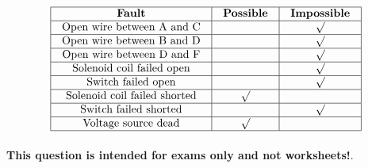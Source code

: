 

$$\vbox{\offinterlineskip
\halign{\strut
\vrule \quad\hfil # \ \hfil & 
\vrule \quad\hfil # \ \hfil & 
\vrule \quad\hfil # \ \hfil \vrule \cr
\noalign{\hrule}
%
{\bf Fault} & {\bf Possible} & {\bf Impossible} \cr
%
\noalign{\hrule}
%
Open wire between A and C &  & $\surd$ \cr
%
\noalign{\hrule}
%
Open wire between B and D &  & $\surd$ \cr
%
\noalign{\hrule}
%
Open wire between D and F &  & $\surd$ \cr
%
\noalign{\hrule}
%
Solenoid coil failed open &  & $\surd$ \cr
%
\noalign{\hrule}
%
Switch failed open &  & $\surd$ \cr
%
\noalign{\hrule}
%
Solenoid coil failed shorted & $\surd$ &  \cr
%
\noalign{\hrule}
%
Switch failed shorted &  & $\surd$ \cr
%
\noalign{\hrule}
%
Voltage source dead & $\surd$ &  \cr
%
\noalign{\hrule}
} %
}$$ %








{\bf This question is intended for exams only and not worksheets!}.


